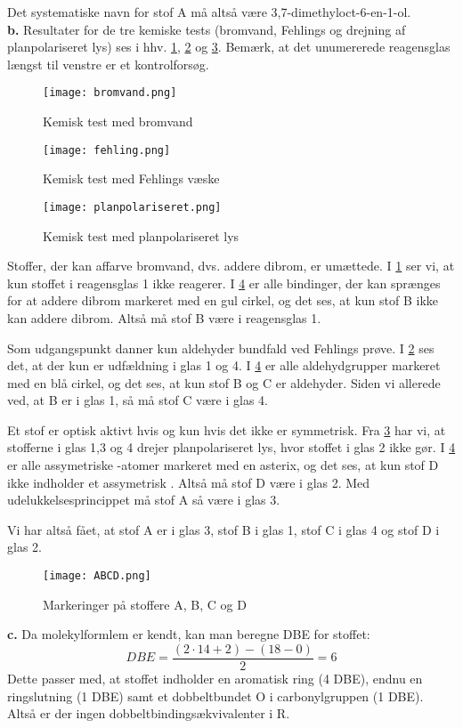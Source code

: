 \documentclass{report}
\begin{document}
Det systematiske navn for stof A må altså være 3,7-dimethyloct-6-en-1-ol.\\[1ex]
\textbf{b.}
Resultater for de tre kemiske tests (bromvand, Fehlings og drejning af planpolariseret lys) ses i hhv. \cref{fig:bromvand}, \cref{fig:fehling} og \cref{fig:lys}.
Bemærk, at det unumererede reagensglas længst til venstre er et kontrolforsøg.
\begin{figure}[H]
\begin{center}
  \texttt{[image: bromvand.png]}
\end{center}
\caption{Kemisk test med bromvand}
\label{fig:bromvand}
\end{figure}
\begin{figure}[H]
\begin{center}
  \texttt{[image: fehling.png]}
\end{center}
\caption{Kemisk test med Fehlings væske}
\label{fig:fehling}
\end{figure}
\begin{figure}[H]
\begin{center}
  \texttt{[image: planpolariseret.png]}
\end{center}
\caption{Kemisk test med planpolariseret lys}
\label{fig:lys}
\end{figure}
Stoffer, der kan affarve bromvand, dvs. addere dibrom, er umættede.
I \cref{fig:bromvand} ser vi, at kun stoffet i reagensglas 1 ikke reagerer.
I \cref{fig:ABCD} er alle bindinger, der kan sprænges for at addere dibrom markeret med en gul cirkel, og det ses, at kun stof B ikke kan addere dibrom.
Altså må stof B være i reagensglas 1.

Som udgangspunkt danner kun aldehyder bundfald ved Fehlings prøve.
I \cref{fig:fehling} ses det, at der kun er udfældning i glas 1 og 4.
I \cref{fig:ABCD} er alle aldehydgrupper markeret med en blå cirkel, og det ses, at kun stof B og C er aldehyder.
Siden vi allerede ved, at B er i glas 1, så må stof C være i glas 4.

Et stof er optisk aktivt hvis og kun hvis det ikke er symmetrisk.
Fra \cref{fig:lys} har vi, at stofferne i glas 1,3 og 4 drejer planpolariseret lys, hvor stoffet i glas 2 ikke gør.
I \cref{fig:ABCD} er alle assymetriske -atomer markeret med en asterix, og det ses, at kun stof D ikke indholder et assymetrisk .
Altså må stof D være i glas 2. 
Med udelukkelsesprincippet må stof A så være i glas 3.

Vi har altså fået, at stof A er i glas 3, stof B i glas 1, stof C i glas 4 og stof D i glas 2.
\begin{figure}[H]
\begin{center}
  \texttt{[image: ABCD.png]}
\end{center}
\caption{Markeringer på stoffere A, B, C og D}
\label{fig:ABCD}
\end{figure}
\noindent \textbf{c.}
Da molekylformlem  er kendt, kan man beregne DBE for stoffet:
\[
DBE=\frac{\left(2 \cdot 14 + 2\right) - \left(18-0\right) }{2}=6
\] 
Dette passer med, at stoffet indholder en aromatisk ring (4 DBE), endnu en ringslutning (1 DBE) samt et dobbeltbundet O i carbonylgruppen (1 DBE).
Altså er der ingen dobbeltbindingsækvivalenter i R.
\end{document}
